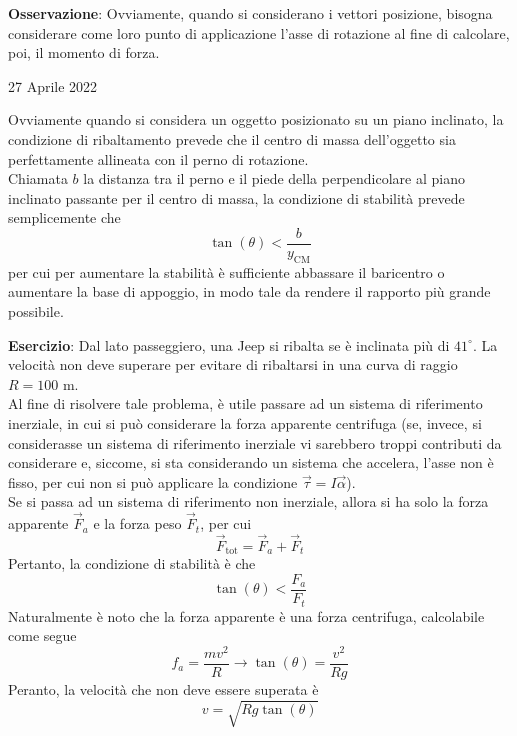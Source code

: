 \documentclass[a4paper]{extarticle}
\begin{document}
\vspace{1em}
\noindent
\textbf{Osservazione}: Ovviamente, quando si considerano i vettori posizione, bisogna considerare come loro punto di applicazione l'asse di rotazione al fine di calcolare, poi, il momento di forza.

\newpage
\noindent
\begin{center}
  27 Aprile 2022
\end{center}
Ovviamente quando si considera un oggetto posizionato su un piano inclinato, la condizione di ribaltamento prevede che il centro di massa dell'oggetto sia perfettamente allineata con il perno di rotazione.\\
Chiamata $b$ la distanza tra il perno e il piede della perpendicolare al piano inclinato passante per il centro di massa, la condizione di stabilità prevede semplicemente che
\[\boxed{\tan(\theta) < \frac{b}{y_{\text{CM}}}}\]
per cui per aumentare la stabilità è sufficiente abbassare il baricentro o aumentare la base di appoggio, in modo tale da rendere il rapporto più grande possibile.

\vspace{1em}
\noindent
\textbf{Esercizio}: Dal lato passeggiero, una Jeep si ribalta se è inclinata più di $41^\circ$. La velocità non deve superare per evitare di ribaltarsi in una curva di raggio $R=100$ m.\\
Al fine di risolvere tale problema, è utile passare ad un sistema di riferimento inerziale, in cui si può considerare la forza apparente centrifuga (se, invece, si considerasse un sistema di riferimento inerziale vi sarebbero troppi contributi da considerare e, siccome, si sta considerando un sistema che accelera, l'asse non è fisso, per cui non si può applicare la condizione $\vec \tau = I \vec \alpha$).\\
Se si passa ad un sistema di riferimento non inerziale, allora si ha solo la forza apparente $\vec F_a$ e la forza peso $\vec F_t$, per cui
\[\vec F_{\text{tot}} = \vec F_a + \vec F_t\]
Pertanto, la condizione di stabilità è che
\[\tan(\theta) < \frac{F_a}{F_t}\]
Naturalmente è noto che la forza apparente è una forza centrifuga, calcolabile come segue
\[f_a=\frac{mv^2}{R} \longrightarrow \tan(\theta)=\frac{v^2}{Rg}\]
Peranto, la velocità che non deve essere superata è
\[\boxed{v=\sqrt{Rg\tan(\theta)}}\]

\vspace{1em}
\end{document}
